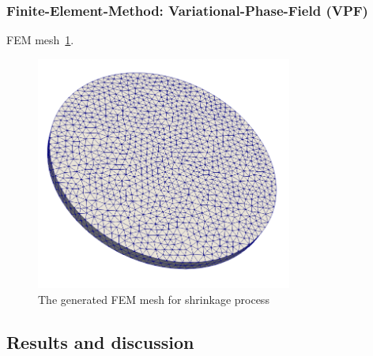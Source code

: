 

\subsubsection*{Finite-Element-Method: Variational-Phase-Field (VPF)}
FEM mesh~\ref{fig:ME5_VPF_setup}.

\begin{figure}[!ht]
\centering
\includegraphics[width=0.75\textwidth]{figures/ME5_VPF_mesh.png}
\caption{The generated FEM mesh for shrinkage process}
\label{fig:ME5_VPF_setup}
\end{figure} 
\subsection{Results and discussion}